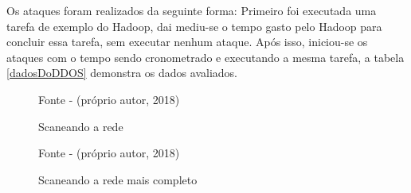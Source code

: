 Os ataques foram realizados da seguinte forma: Primeiro foi executada uma tarefa de exemplo do Hadoop, dai mediu-se o tempo gasto pelo Hadoop para concluir essa tarefa, sem executar nenhum ataque. Após isso, iniciou-se os ataques com o tempo sendo cronometrado e executando a mesma tarefa, a tabela \ref{dadosDoDDOS} demonstra os dados avaliados.


\begin{figure}[htbp!] \begin{center}
\caption{Scaneando a rede}
\small{Fonte - (próprio autor, 2018)}
\label{Fig:Scaneando a rede}
\end{center} \end{figure}

\begin{figure}[htbp!] \begin{center}
\caption{Scaneando a rede mais completo}
\small{Fonte - (próprio autor, 2018)}
\label{Fig:Scaneando a rede mais completo}
\end{center} \end{figure}

